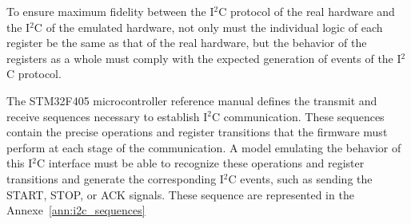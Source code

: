 To ensure maximum fidelity between the I$^2$C protocol of the real hardware and 
the I$^2$C of the emulated hardware, not only must the individual logic of each register 
be the same as that of the real hardware, but the behavior of the registers as a whole 
must comply with the expected generation of events of the I$^2$C protocol.

The STM32F405 microcontroller reference manual defines the transmit and 
receive sequences necessary to establish I$^2$C communication. These sequences contain 
the precise operations and register transitions that the firmware must perform at 
each stage of the communication. A model emulating the behavior of this I$^2$C 
interface must be able to recognize these operations and register transitions and 
generate the corresponding I$^2$C events, such as sending the START, STOP, or ACK signals.
These sequence are represented in the Annexe~\ref{ann:i2c_sequences}



%
%


